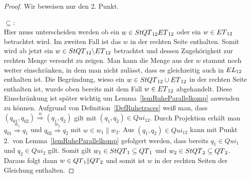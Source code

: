 \begin{proof}
  Wir beweisen nur den 2. Punkt.

  \glqq $\subseteq$\grqq :\\
  Hier muss unterscheiden werden ob ein $w\in StQT{}_{12} ET{}_{12}$ oder ein
  $w\in ET{}_{12}$ betrachtet wird. Im zweiten Fall ist das
  $w$ in der rechten Seite enthalten. Somit wird ab jetzt ein $w\in
  StQT{}_{12}\backslash ET{}_{12}$ betrachtet und dessen Zugehörigkeit zur
  rechten Menge versucht zu zeigen. Man kann die Menge aus der $w$ stammt noch
  weiter einschränken, in dem man nicht zulässt, dass es gleichzeitig auch in
  $EL{}_{12}$ enthalten ist. Die Begründung, wieso ein $w\in StQT{}_{12}\cup
  ET{}_{12}$ in der rechten Seite enthalten ist, wurde oben bereits mit dem
  Fall $w\in ET{}_{12}$ abgehandelt. Diese Einschränkung ist später wichtig um
  Lemma~\ref{lemRuheParallelkomp} anwenden zu können. Aufgrund von
  Definition~\ref{DefRuhetraces} weiß man, dass $(q_{01},q_{02})
  \overset{w}{\Rightarrow} (q_1,q_2)$ gilt mit $(q_1,q_2)\in Qui_{12}$. Durch
  Projektion erhält man $q_{01} \overset{w_1}{\Rightarrow} q_1$ und $q_{02}
  \overset{w_2}{\Rightarrow} q_2$ mit $w\in w_1\|w_2$. Aus $(q_1,q_2)\in
  Qui_{12}$ kann mit Punkt 2.\ von Lemma~\ref{lemRuheParallelkomp} gefolgert
  werden, dass bereits $q_1\in Qui_1$ und $q_2\in Qui_2$ gilt. Somit gilt
  $w_1\in StQT{}_1\subseteq QT{}_1$ und $w_2\in StQT{}_2\subseteq QT{}_2$.
  Daraus folgt dann $w\in QT{}_1\|QT{}_2$ und somit ist $w$ in der rechten
  Seiten der Gleichung enthalten.


\end{proof}
